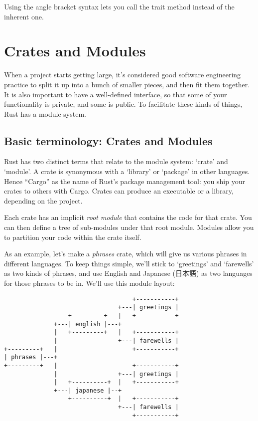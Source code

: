 \documentclass[a4paper,]{book}
\begin{document}
Using the angle bracket syntax lets you call the trait method instead of
the inherent one.

\hypertarget{sec--crates-and-modules}{\section{Crates and
Modules}\label{sec--crates-and-modules}}

When a project starts getting large, it's considered good software
engineering practice to split it up into a bunch of smaller pieces, and
then fit them together. It is also important to have a well-defined
interface, so that some of your functionality is private, and some is
public. To facilitate these kinds of things, Rust has a module system.

\subsection{Basic terminology: Crates and
Modules}\label{basic-terminology-crates-and-modules}

Rust has two distinct terms that relate to the module system: `crate'
and `module'. A crate is synonymous with a `library' or `package' in
other languages. Hence ``Cargo'' as the name of Rust's package
management tool: you ship your crates to others with Cargo. Crates can
produce an executable or a library, depending on the project.

Each crate has an implicit \emph{root module} that contains the code for
that crate. You can then define a tree of sub-modules under that root
module. Modules allow you to partition your code within the crate
itself.

As an example, let's make a \emph{phrases} crate, which will give us
various phrases in different languages. To keep things simple, we'll
stick to `greetings' and `farewells' as two kinds of phrases, and use
English and Japanese (日本語) as two languages for those phrases to be
in. We'll use this module layout:

\begin{verbatim}
                                    +-----------+
                                +---| greetings |
                  +---------+   |   +-----------+
              +---| english |---+
              |   +---------+   |   +-----------+
              |                 +---| farewells |
+---------+   |                     +-----------+
| phrases |---+
+---------+   |                     +-----------+
              |                 +---| greetings |
              |   +----------+  |   +-----------+
              +---| japanese |--+
                  +----------+  |   +-----------+
                                +---| farewells |
                                    +-----------+
\end{verbatim}
\end{document}
